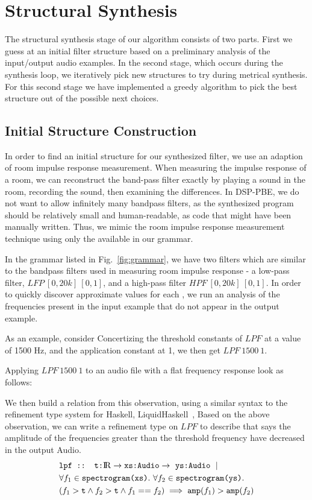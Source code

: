 \section{Structural Synthesis}
\label{sec:struct}

The structural synthesis stage of our algorithm consists of two parts.
First we guess at an initial filter structure based on a preliminary analysis of the input/output audio examples.
In the second stage, which occurs during the synthesis loop, we iteratively pick new structures to try during metrical synthesis.
For this second stage we have implemented a greedy algorithm to pick the best structure out of the possible next choices.

\subsection{Initial Structure Construction}
\label{sec:initStruct}
In order to find an initial structure for our synthesized filter, we use an adaption of room impulse response measurement.
When measuring the impulse response of a room, we can reconstruct the band-pass filter exactly by playing a sound in the room, recording the sound, then examining the differences.
In DSP-PBE, we do not want to allow infinitely many bandpass filters, as the synthesized program should be relatively small and human-readable, as code that might have been manually written.
Thus, we mimic the room impulse response measurement technique using only the available \dspnode in our grammar.

In the grammar listed in Fig.~\ref{fig:grammar}, we have two filters which are similar to the bandpass filters used in measuring room impulse response - a low-pass filter, $LFP \ [0,20k]\ [0,1]$, and a high-pass filter $HPF\ [0,20k]\ [0,1]$.
In order to quickly discover approximate values for each \dspnode, we run an analysis of the frequencies present in the input example that do not appear in the output example.

As an example, consider 
Concertizing the threshold constants of $LPF$ at a value of 1500 Hz, and the application constant at 1, we then get $LPF \ 1500 \ 1$.

Applying $LPF \ 1500 \ 1$ to an audio file with a flat frequency response look as follows:

We then build a relation from this observation, using a similar syntax to the refinement type system for Haskell, LiquidHaskell~\cite{vazou2014refinement}, 
Based on the above observation, we can write a refinement type on $LPF$ to describe that says the amplitude of the frequencies greater than the threshold frequency have decreased in the output Audio.
%
\begin{align*}
  &\texttt{lpf :: t:\reals} \to  \texttt{xs:Audio} \to\ \texttt{ys:Audio}\ \mid \\
  &\forall f_1 \in  \texttt{spectrogram(xs)}.\ \forall f_2 \in \texttt{spectrogram(ys)}. \\
  &(f_1 > \texttt{t}  \land  f_2 > \texttt{t}  \land f_1 == f_2) \implies \texttt{amp}(f_1) > \texttt{amp}(f_2)
\end{align*}

